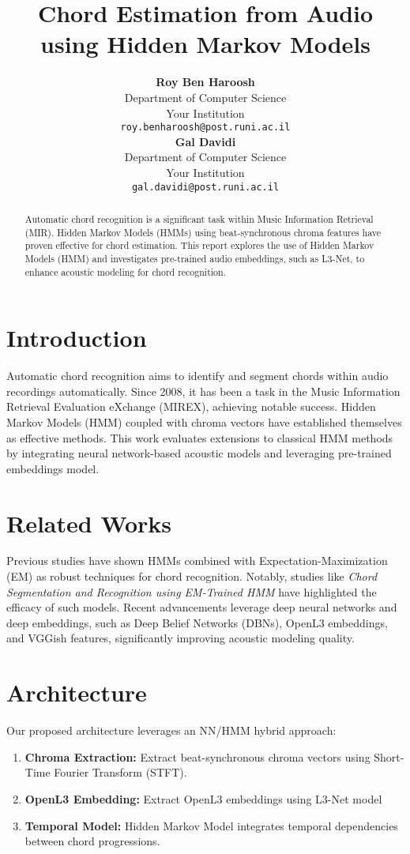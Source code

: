 \documentclass{article}
\title{Chord Estimation from Audio using Hidden Markov Models}
\author{
\textbf{Roy Ben Haroosh}\\
Department of Computer Science\\
Your Institution\\
\texttt{roy.benharoosh@post.runi.ac.il}\\
\textbf{Gal Davidi}\\
Department of Computer Science\\
Your Institution\\
\texttt{gal.davidi@post.runi.ac.il}}
\begin{document}
\maketitle

\begin{abstract}
Automatic chord recognition is a significant task within Music Information Retrieval (MIR).
Hidden Markov Models (HMMs) using beat-synchronous chroma features have proven effective for chord estimation.
This report explores the use of Hidden Markov Models (HMM) and investigates pre-trained audio embeddings, such as L3-Net, to enhance acoustic modeling for chord recognition.
\end{abstract}

\section{Introduction}
Automatic chord recognition aims to identify and segment chords within audio recordings automatically.
Since 2008, it has been a task in the Music Information Retrieval Evaluation eXchange (MIREX), achieving notable success.
Hidden Markov Models (HMM) coupled with chroma vectors have established themselves as effective methods.
This work evaluates extensions to classical HMM methods by integrating neural network-based acoustic models and leveraging pre-trained embeddings model.

\section{Related Works}
Previous studies have shown HMMs combined with Expectation-Maximization (EM) as robust techniques for chord recognition. Notably, studies like \textit{Chord Segmentation and Recognition using EM-Trained HMM} have highlighted the efficacy of such models. Recent advancements leverage deep neural networks and deep embeddings, such as Deep Belief Networks (DBNs), OpenL3 embeddings, and VGGish features, significantly improving acoustic modeling quality.

\section{Architecture}
Our proposed architecture leverages an NN/HMM hybrid approach:
\begin{enumerate}
    \item \textbf{Chroma Extraction:} Extract beat-synchronous chroma vectors using Short-Time Fourier Transform (STFT).
    \item \textbf{OpenL3 Embedding:} Extract OpenL3 embeddings using L3-Net model
    \item \textbf{Temporal Model:} Hidden Markov Model integrates temporal dependencies between chord progressions.
\end{enumerate}
\end{document}
